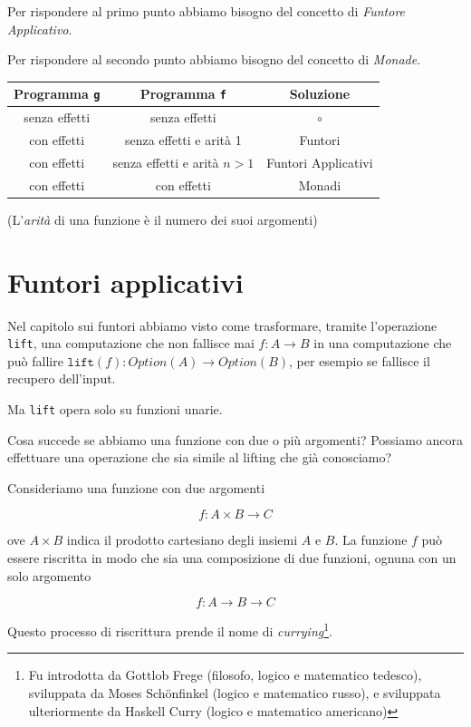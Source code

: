 \documentclass[12pt]{article}
\theoremstyle{definition}
\begin{document}
Per rispondere al primo punto abbiamo bisogno del concetto di \emph{Funtore Applicativo}.

Per rispondere al secondo punto abbiamo bisogno del concetto di \emph{Monade}.

\begin{center}
\bgroup
\def\arraystretch{1.5}
\begin{tabular}{ |c|c|c| }
\hline
Programma \texttt{g} & Programma \texttt{f} & Soluzione \\
\hline
senza effetti & senza effetti & $\circ$ \\
\hline
con effetti & senza effetti e arità 1 & Funtori \\
\hline
con effetti & senza effetti e arità $n > 1$ & Funtori Applicativi \\
\hline
con effetti & con effetti & Monadi \\
\hline
\end{tabular}
\egroup
\end{center}

(L'\emph{arità} di una funzione è il numero dei suoi argomenti)

\newpage

\section{Funtori applicativi}

Nel capitolo sui funtori abbiamo visto come trasformare, tramite l'operazione \texttt{lift},
una computazione che non fallisce mai $f: A \rightarrow B$ in una computazione che può fallire $\texttt{lift}(f): Option(A) \rightarrow Option(B)$,
per esempio se fallisce il recupero dell'input.

Ma \texttt{lift} opera solo su funzioni unarie.

Cosa succede se abbiamo una funzione con due o più argomenti?
Possiamo ancora effettuare una operazione che sia simile al lifting che già conosciamo?

Consideriamo una funzione con due argomenti

$$
f: A \times B \rightarrow C
$$

ove $A \times B$ indica il prodotto cartesiano degli insiemi $A$ e $B$.
La funzione $f$ può essere riscritta in modo che sia una composizione di due funzioni, ognuna con un solo argomento

$$
f: A \rightarrow B \rightarrow C
$$

Questo processo di riscrittura prende il nome di \emph{currying}\footnote{Fu introdotta da Gottlob Frege (filosofo, logico e matematico tedesco), sviluppata da Moses Schönfinkel (logico e matematico russo), e sviluppata ulteriormente da Haskell Curry (logico e matematico americano)}.
\end{document}
